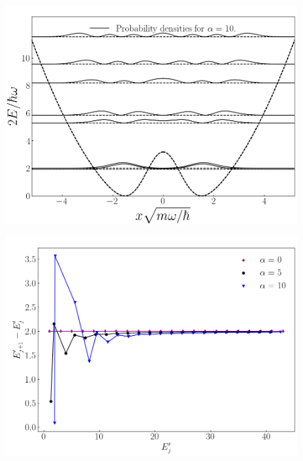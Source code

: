 \documentclass[twocolumn]{article}
\begin{document}
\begin{large}
\begin{figure}
\end{figure}
\newpage
\blindtext
\begin{figure}
    \centering
    \includegraphics[scale=0.35]{alpha10_density.png}
\end{figure}
\begin{figure}
    \centering
    \includegraphics[scale=0.35]{relationship.png}
\end{figure}

\end{large}
\end{document}
